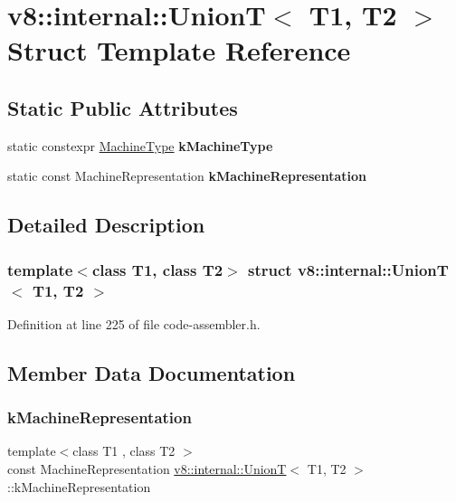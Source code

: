 \hypertarget{structv8_1_1internal_1_1UnionT}{}\section{v8\+:\+:internal\+:\+:UnionT$<$ T1, T2 $>$ Struct Template Reference}
\label{structv8_1_1internal_1_1UnionT}
\subsection*{Static Public Attributes}
\begin{DoxyCompactItemize}
\item 
static constexpr \mbox{\hyperlink{classv8_1_1internal_1_1MachineType}{Machine\+Type}} {\bfseries k\+Machine\+Type}
\item 
static const Machine\+Representation {\bfseries k\+Machine\+Representation}
\end{DoxyCompactItemize}


\subsection{Detailed Description}
\subsubsection*{template$<$class T1, class T2$>$\newline
struct v8\+::internal\+::\+Union\+T$<$ T1, T2 $>$}



Definition at line 225 of file code-\/assembler.\+h.



\subsection{Member Data Documentation}
\mbox{\label{structv8_1_1internal_1_1UnionT_ae672253135cd88dd6e2a3e530df781c5}} 
\subsubsection{\texorpdfstring{k\+Machine\+Representation}{kMachineRepresentation}}
{\footnotesize\ttfamily template$<$class T1 , class T2 $>$ \\
const Machine\+Representation \mbox{\hyperlink{structv8_1_1internal_1_1UnionT}{v8\+::internal\+::\+UnionT}}$<$ T1, T2 $>$\+::k\+Machine\+Representation\hspace{0.3cm}{\ttfamily [static]}}


